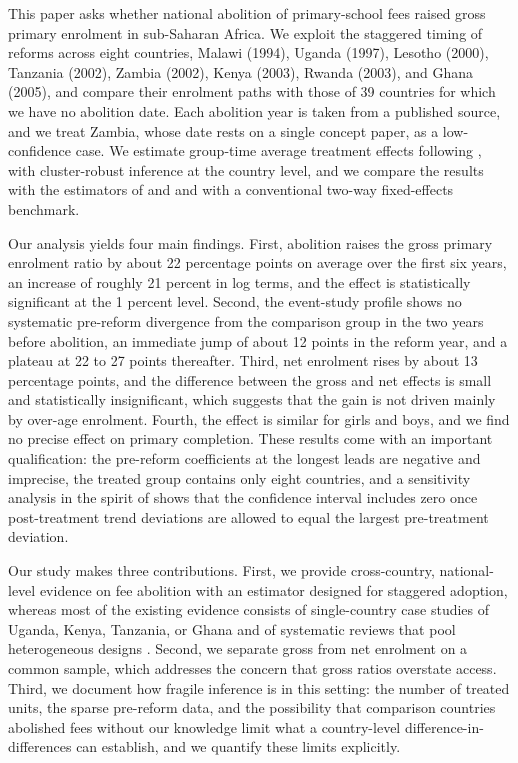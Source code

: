 \documentclass[12pt]{article}
\begin{document}
This paper asks whether national abolition of primary-school fees raised gross primary enrolment in sub-Saharan Africa. We exploit the staggered timing of reforms across eight countries, Malawi (1994), Uganda (1997), Lesotho (2000), Tanzania (2002), Zambia (2002), Kenya (2003), Rwanda (2003), and Ghana (2005), and compare their enrolment paths with those of 39 countries for which we have no abolition date. Each abolition year is taken from a published source, and we treat Zambia, whose date rests on a single concept paper, as a low-confidence case. We estimate group-time average treatment effects following \citet{callaway2021difference}, with cluster-robust inference at the country level, and we compare the results with the estimators of \citet{sun2021estimating} and \citet{borusyak2024revisiting} and with a conventional two-way fixed-effects benchmark.

Our analysis yields four main findings. First, abolition raises the gross primary enrolment ratio by about 22 percentage points on average over the first six years, an increase of roughly 21 percent in log terms, and the effect is statistically significant at the 1 percent level. Second, the event-study profile shows no systematic pre-reform divergence from the comparison group in the two years before abolition, an immediate jump of about 12 points in the reform year, and a plateau at 22 to 27 points thereafter. Third, net enrolment rises by about 13 percentage points, and the difference between the gross and net effects is small and statistically insignificant, which suggests that the gain is not driven mainly by over-age enrolment. Fourth, the effect is similar for girls and boys, and we find no precise effect on primary completion. These results come with an important qualification: the pre-reform coefficients at the longest leads are negative and imprecise, the treated group contains only eight countries, and a sensitivity analysis in the spirit of \citet{rambachan2023credible} shows that the confidence interval includes zero once post-treatment trend deviations are allowed to equal the largest pre-treatment deviation.

Our study makes three contributions. First, we provide cross-country, national-level evidence on fee abolition with an estimator designed for staggered adoption, whereas most of the existing evidence consists of single-country case studies of Uganda, Kenya, Tanzania, or Ghana \citep{kan2020evaluating,oketch2010free,lindsjo2017everybody,pajibo2017influence} and of systematic reviews that pool heterogeneous designs \citep{morgan2014eliminating,fermah2026school,fermah2026effect}. Second, we separate gross from net enrolment on a common sample, which addresses the concern that gross ratios overstate access. Third, we document how fragile inference is in this setting: the number of treated units, the sparse pre-reform data, and the possibility that comparison countries abolished fees without our knowledge limit what a country-level difference-in-differences can establish, and we quantify these limits explicitly.
\end{document}
